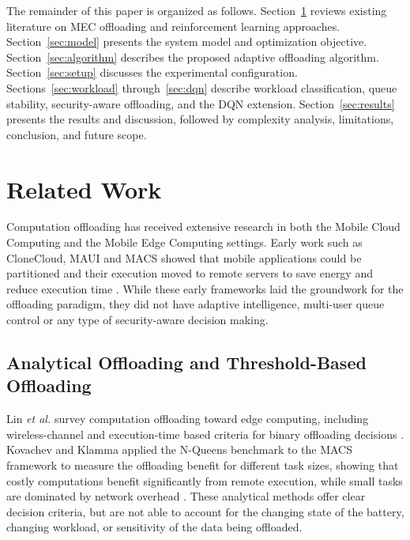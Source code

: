 \documentclass{ieeeaccess}
\begin{document}
The remainder of this paper is organized as follows. Section~\ref{sec:related} reviews existing literature on MEC offloading and reinforcement learning approaches. Section~\ref{sec:model} presents the system model and optimization objective. Section~\ref{sec:algorithm} describes the proposed adaptive offloading algorithm. Section~\ref{sec:setup} discusses the experimental configuration. Sections~\ref{sec:workload} through~\ref{sec:dqn} describe workload classification, queue stability, security-aware offloading, and the DQN extension. Section~\ref{sec:results} presents the results and discussion, followed by complexity analysis, limitations, conclusion, and future scope.

\section{Related Work}
\label{sec:related}
Computation offloading has received extensive research in both the Mobile Cloud Computing and the Mobile Edge Computing settings. Early work such as CloneCloud, MAUI and MACS showed that mobile applications could be partitioned and their execution moved to remote servers to save energy and reduce execution time \cite{kovachev2012,cuervo2010,chun2011}. While these early frameworks laid the groundwork for the offloading paradigm, they did not have adaptive intelligence, multi-user queue control or any type of security-aware decision making.

\subsection{Analytical Offloading and Threshold-Based Offloading}
Lin \emph{et al.} survey computation offloading toward edge computing, including wireless-channel and execution-time based criteria for binary offloading decisions \cite{lin2019}. Kovachev and Klamma applied the N-Queens benchmark to the MACS framework to measure the offloading benefit for different task sizes, showing that costly computations benefit significantly from remote execution, while small tasks are dominated by network overhead \cite{kovachev2012}. These analytical methods offer clear decision criteria, but are not able to account for the changing state of the battery, changing workload, or sensitivity of the data being offloaded.
\end{document}
